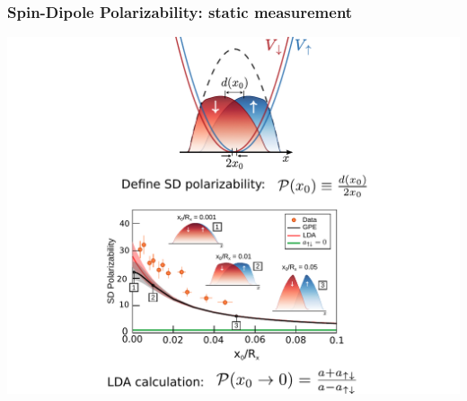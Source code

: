 \begin{frame}
\frametitle{Spin-Dipole Polarizability: static measurement}

\centering
\includegraphics[width=0.9\linewidth]{Figures/SD_Polarizability2.pdf}

\end{frame}
